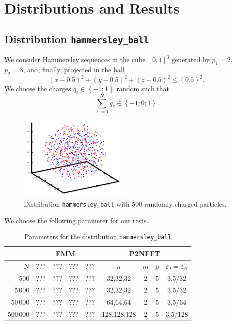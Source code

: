 \section{Distributions and Results}
\label{sec:VertErg}
\subsection{Distribution \texttt{hammersley\_ball}}
We consider Hammersley sequences in the cube $\left[0 , 1 \right]^3$
generated by $p_1 = 2$, $p_2 = 3$, and, finally, projected in the ball
\[
(x-0.5)^2 + (y-0.5)^2 + (z-0.5)^2 \leq (0.5)^2.
\]
We choose the charges $q_\ell \in \left\lbrace -1 ; 1\right\rbrace$
random such that
\[
  \sum\limits_{\ell=1}^{N} q_\ell \in \left\lbrace -1 ; 0; 1\right\rbrace.
\]

\begin{figure}[ht]
  \centering
  \includegraphics[width=0.5\textwidth]{figures/hball_500}
  \caption{Distribution \texttt{hammersley\_{}ball} with 500 randomly charged particles.}
\end{figure}

We choose the following parameter for our tests.

\begin{table}[p]
  \begin{footnotesize}
    \begin{center}
      \begin{tabular}{|r||c|c|c|c||c|c|c|c|}
        \hline \rule{0cm}{2.5ex}
        & \multicolumn{4}{c|}{FMM} & \multicolumn{4}{c|}{P2NFFT} \\
        \hline \rule{0cm}{2.5ex}
        N & ??? & ??? & ??? & ??? & $n$ & $m$ & $p$ & $\varepsilon_{I} = \varepsilon_{B}$ \\
        \hline
        500      & ??? & ??? & ??? & ??? & 32,32,32 & 2 & 5 & 3.5/32 \\
        5\,000   & ??? & ??? & ??? & ??? & 32,32,32 & 2 & 5 & 3.5/32 \\
        50\,000  & ??? & ??? & ??? & ??? & 64,64,64 & 2 & 5 & 3.5/64 \\
        500\,000 & ??? & ??? & ??? & ??? & 128,128,128 & 2 & 5 & 3.5/128 \\
        \hline
      \end{tabular}
    \end{center}
  \end{footnotesize}
  \caption{Parameters for the distribution \texttt{hammersley\_{}ball}}
\end{table}


